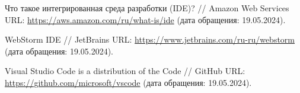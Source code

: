 \begin{thebibliography}{99\kern\bibindent}
	\begin{comment}
	\bibitem{bib:vk_nft_diploma} Пользователи ВКонтакте смогут подтвердить своё образование с помощью NFT-дипломов // VK Press URL: \url{https://vk.com/press/nft-diploma} (дата обращения: 04.03.2024).

	\bibitem{bib:mipt_nft_diploma} Выпускники магистратуры «Блокчейн» получили дипломы в виде NFT // Магистратура МФТИ по технологиям блокчейна URL: \url{https://blockchain.mipt.ru/news/40} (дата обращения: 04.03.2024).

	\bibitem{bib:func_and_nf_req} Самое полное руководство по управлению требованиями и отслеживаемости // Visure Solutions URL: \url{https://visuresolutions.com/ru/requirements-management-traceability-guide/functional-vs-non-functional-requirements} (дата обращения: 07.04.2024).

	\bibitem{bib:app_req} Определение требований к программному обеспечению  // Narod.ru URL: \url{https://chaox-dump.narod.ru/ooap/ooapl6.html} (дата обращения: 07.04.2024).

	\bibitem{bib:152fz} Федеральный закон от 27.07.2006 г. № 152-ФЗ // Kremlin.ru URL: \url{http://kremlin.ru/acts/bank/24154} (дата обращения: 07.04.2024).
	
	\bibitem{bib:sc_abi} Финогеев А. Г., Васин С. М., Гамидуллаева Л. А., Финогеев А. А. // Технология смарт контрактов на основе блокчейн для минимизации трансакционных издержек в региональных инновационных системах // Вопросы безопасности. 2018. №3: 46-48. %

	\bibitem{bib:ipfs_is} IPFS вместо HTTP — будущее децентрализованного интернета // ForkLog URL: \url{https://forklog.com/cryptorium/chto-takoe-ipfs} (дата обращения: 07.04.2024).
	\end{comment}
	
	 Что такое интегрированная среда разработки (IDE)? // Amazon Web Services URL: \url{https://aws.amazon.com/ru/what-is/ide} (дата обращения: 19.05.2024).

	 WebStorm IDE // JetBrains URL: \url{https://www.jetbrains.com/ru-ru/webstorm} (дата обращения: 19.05.2024).

	 Visual Studio Code is a distribution of the Code // GitHub URL: \url{https://github.com/microsoft/vscode} (дата обращения: 19.05.2024).


\end{thebibliography}
